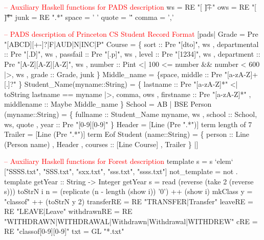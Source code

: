 \begin{code}
\textcolor{red}{-- Auxiliary Haskell functions for PADS description}
ws   = RE "[ \t]+"
ows  = RE "[ \t]*"
junk = RE ".*"
space = ' '
quote = '\''
comma = ','
\end{code}

\begin{code}
\textcolor{red}{-- PADS description of Princeton CS Student Record Format}
[pads| 
   Grade = Pre "[ABCD][+-]?|F|AUD|N|INC|P"
\mbox{}
   Course = 
    \{ sort         :: Pre "[dto]",           ws
    , departmental :: Pre "[.D]",            ws
    , passfail     :: Pre "[.p]",            ws
    , level        :: Pre "[1234]",          ws
    , department   :: Pre "[A-Z][A-Z][A-Z]", ws
    , number       :: Pint  <| 100 <= number && number < 600 |>, ws
    , grade        :: Grade,                 junk                               
    \} 
\mbox{}
   Middle_name = \{space, middle :: Pre "[a-zA-Z]+[.]?" \}    
\mbox{} 
   Student_Name(myname::String) = 
    \{ lastname   :: Pre "[a-zA-Z]*"   <| toString lastname ==  myname |>,  comma, ows     
    , firstname  :: Pre "[a-zA-Z]*" 
    , middlename :: Maybe Middle_name
    \}
\mbox{}
   School = AB | BSE
\mbox{}
   Person (myname::String) =
    \{ fullname   :: Student_Name myname,    ws
    , school     :: School,                 ws, quote
    , year       :: Pre "[0-9][0-9]"
    \}
\mbox{}
   Header  = [Line (Pre ".*")]  term length of 7 
   Trailer = [Line (Pre ".*")]  term Eof 
   Student (name::String) = 
    \{ person  :: Line (Person name)
    , Header  
    , courses :: [Line Course]
    , Trailer
    \}
|]
\end{code}

\begin{code}
\textcolor{red}{-- Auxiliary Haskell functions for Forest description}
template s = s `elem` ["SSSS.txt", "SSS.txt", "sxx.txt", "sss.txt", "ssss.txt"]
not_template = not . template
\mbox{}
getYear :: String -> Integer
getYear s = read (reverse (take 2 (reverse s)))
toStrN i n = (replicate  (n - length (show i)) '0') ++ (show i)
mkClass y = "classof" ++ (toStrN y 2)
\mbox{}
transferRE  = RE "TRANSFER|Transfer"
leaveRE     = RE "LEAVE|Leave"
withdrawnRE = RE "WITHDRAWN|WITHDRAWAL|Withdrawn|Withdrawal|WITHDREW"
cRE         = RE "classof[0-9][0-9]" 
txt         = GL "*.txt"
\end{code}
\vfill



